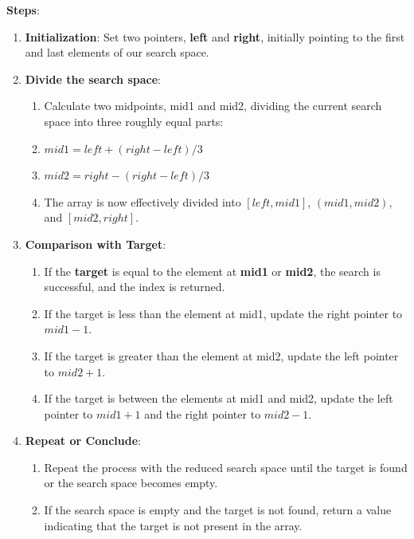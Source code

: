 \vspace{0.2cm}
\textbf{Steps}:
\begin{enumerate}
    \item \textbf{Initialization}: Set two pointers, \textbf{left} and \textbf{right}, initially pointing to the first and last elements of our search space.

    \item \textbf{Divide the search space}:
    \begin{enumerate}
        \item Calculate two midpoints, mid1 and mid2, dividing the current search space into three roughly equal parts:
        \item[] $mid1 = left + (right - left) / 3$
        \item[] $mid2 = right - (right - left) / 3$
        \item The array is now effectively divided into $[left, mid1]$, $(mid1, mid2)$, and $[mid2, right]$.
    \end{enumerate}

    \item \textbf{Comparison with Target}:
    \begin{enumerate}
        \item If the \textbf{target} is equal to the element at \textbf{mid1} or \textbf{mid2}, the search is successful, and the index is returned.

        \item If the target is less than the element at mid1, update the right pointer to $mid1 - 1$.

        \item If the target is greater than the element at mid2, update the left pointer to $mid2 + 1$.

        \item If the target is between the elements at mid1 and mid2, update the left pointer to $mid1 + 1$ and the right pointer to $mid2 - 1$.
    \end{enumerate}

    \item \textbf{Repeat or Conclude}:
    \begin{enumerate}
        \item Repeat the process with the reduced search space until the target is found or the search space becomes empty.

        \item If the search space is empty and the target is not found, return a value indicating that the target is not present in the array.
    \end{enumerate}
\end{enumerate}

